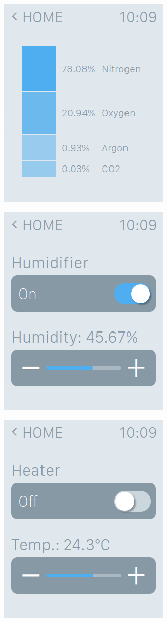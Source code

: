 \documentclass[a4paper,10pt]{article}
\begin{document}
\includegraphics[scale=0.4]{images/composition.png}

\includegraphics[scale=0.4]{images/humidity.png}

\includegraphics[scale=0.4]{images/temperature.png}
\end{document}
